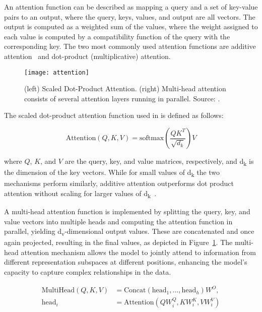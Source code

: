 An attention function can be described as mapping a query and a set of key-value pairs to an output, where the query, keys, values, and output are all vectors.
The output is computed as a weighted sum of the values, where the weight assigned to each value is computed by a compatibility function of the query with the corresponding key.
The two most commonly used attention functions are additive attention~\cite{bahdanau2014neural} and dot-product (multiplicative) attention.
\begin{figure}[h]
	\centering
	\texttt{[image: attention]}
	\caption{(left) Scaled Dot-Product Attention. (right) Multi-head attention consists of several attention layers running in parallel. Source: \textcite{vaswani2023attention}.}
	\label{fig:attention}
\end{figure}
The scaled dot-product attention function used in \textcite{vaswani2023attention} is defined as follows:

\begin{equation}
	\text{Attention}(Q, K, V) = \text{softmax}\left(\frac{QK^T}{\sqrt{d_k}}\right)V
	\label{eq:dot-scaled-attention}
\end{equation}

\noindent where \(Q\), \(K\), and \(V\) are the query, key, and value matrices, respectively, and d\textsubscript{k} is the dimension of the key vectors.
While for small values of d\textsubscript{k} the two mechanisms perform similarly, additive attention outperforms dot product attention without scaling for larger values of d\textsubscript{k}~\cite{britz2017massive}.

A multi-head attention function is implemented by splitting the query, key, and value vectors into multiple heads and computing the attention function in parallel, yielding d\textsubscript{v}-dimensional output values.
These are concatenated and once again projected, resulting in the final values, as depicted in Figure~\ref{fig:attention}.
The multi-head attention mechanism allows the model to jointly attend to information from different representation subspaces at different positions, enhancing the model's capacity to capture complex relationships in the data.

\begin{equation}
	\begin{aligned}
		\text{MultiHead}(Q, K, V) & = \text{Concat}(\text{head}_1, \ldots, \text{head}_h)W^O, \\
		\text{head}_i             & = \text{Attention}(QW_i^Q, KW_i^K, VW_i^V)
	\end{aligned}
	\label{eq:multihead-attention}
\end{equation}

